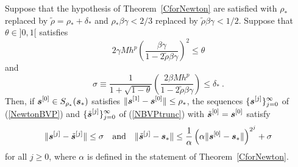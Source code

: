 \begin{theorem}
Suppose that the hypothesis of Theorem~\ref{CforNewton} are
satisfied with $\rho_\ast$ replaced by
$\tilde{\rho} = \rho_\ast + \delta_\ast$ and
$\rho_\ast\beta\gamma < 2/3$ replaced by $\tilde{\rho}\beta\gamma < 1/2$.
Suppose that $\theta \in ]0,1[$ satisfies
\begin{equation} \label{errorA}
2\gamma M h^p \left( \frac{\beta\gamma}{1-2\tilde{\rho}\beta\gamma}\right)^2
\leq \theta 
\end{equation}
and
\begin{equation} \label{errorB}
\sigma \equiv \frac{1}{1+\sqrt{1-\theta}}\left(
\frac{2\beta M h^p}{1-2\tilde{\rho}\beta\gamma} \right)
\leq \delta_\ast \ . 
\end{equation}
Then, if $\displaystyle \bm{s}^{[0]} \in S_{\rho_\ast}(\bm{s}_\ast)$ satisfies
$\displaystyle \| \bm{s}^{[1]} - \bm{s}^{[0]} \| \leq \rho_\ast$, the
sequences $\displaystyle \{ \bm{s}^{[j]} \}_{j=0}^\infty$ of
(\ref{NewtonBVP}) and
$\displaystyle \{ \tilde{\bm{s}}^{[j]} \}_{j=0}^\infty$ of
(\ref{NBVPtrunc}) with
$\displaystyle \tilde{\bm{s}}^{[0]} = \bm{s}^{[0]}$ satisfy
\[
\| \bm{s}^{[j]} - \tilde{\bm{s}}^{[j]} \|  \leq \sigma
\quad \text{and} \quad
\| \tilde{\bm{s}}^{[j]} - \bm{s}_\ast \| \leq
\frac{1}{\alpha} \left( \alpha
\| \bm{s}^{[0]} - \bm{s}_\ast \|  \right)^{2^j} + \sigma
\]
for all $j\geq 0$, where $\alpha$ is defined in the statement of
Theorem~\ref{CforNewton}.
\end{theorem}

